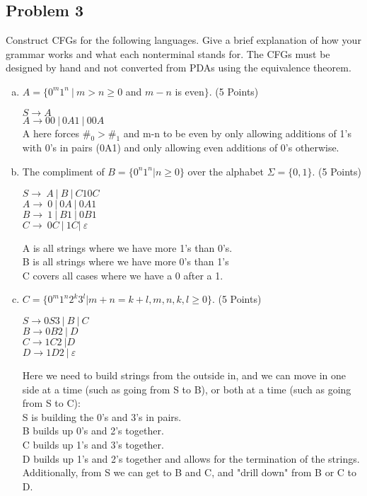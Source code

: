 \documentclass{article}
\begin{document}
\newpage


\subsection*{Problem 3}
Construct CFGs for the following languages. Give a brief explanation of how your
grammar works and what each nonterminal stands for. The CFGs must be designed
by hand and not converted from PDAs using the equivalence theorem.

\begin{enumerate}[(a)]
\item $A = \{0^m1^n\ |\ m > n \geq 0$ and $ m - n$ is even$\}$. (5 Points)

$S \rightarrow A$ \\
$A \rightarrow 00\ |\ 0A1\ |\ 00A $\\
A here forces $\#_0 > \#_1$ and m-n to be even by only allowing additions of 1's with 0's in
pairs (0A1) and only allowing even additions of 0's otherwise.


\item The compliment of $B = \{0^n1^n | n \geq 0\}$ over the alphabet $\Sigma = \{0,1\}$. (5 Points)

$S \rightarrow\ A\ |\ B\ |\ C10C $ \\
$A \rightarrow\ 0\ |\ 0A\ |\ 0A1 $ \\
$B \rightarrow\ 1\ |\ B1\ |\ 0B1 $ \\
$C \rightarrow\ 0C\ |\ 1C |\ \varepsilon $

A is all strings where we have more 1's than 0's. \\
B is all strings where we have more 0's than 1's \\
C covers all cases where we have a 0 after a 1.

\item $C = \{0^m1^n2^k3^l | m+n=k+l, m,n,k,l \geq 0\}$. (5 Points)

$S \rightarrow 0S3\ |\ B\ |\ C $ \\
$B \rightarrow 0B2\ |\ D $ \\
$C \rightarrow 1C2\ | D $ \\
$D \rightarrow 1D2\ |\ \varepsilon$

Here we need to build strings from the outside in, and we can move in one side at a time
(such as going from S to B), or both at a time (such as going from S to C): \\
S is building the 0's and 3's in pairs. \\
B builds up 0's and 2's together. \\
C builds up 1's and 3's together. \\
D builds up 1's and 2's together and allows for the termination of the strings. Additionally,
from S we can get to B and C, and "drill down" from B or C to D.

\end{enumerate}
\end{document}
